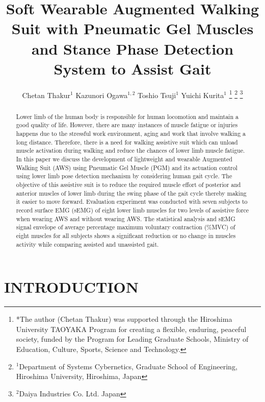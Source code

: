 \documentclass[letterpaper, 10 pt, conference]{ieeeconf}  %
\title{\LARGE \bf
Soft Wearable Augmented Walking Suit with Pneumatic Gel Muscles and Stance Phase Detection System to Assist Gait
}
\author{Chetan Thakur$^{1}$ Kazunori Ogawa$^{1,2}$ Toshio Tsuji$^{1}$ Yuichi Kurita$^{1}$%
\thanks{*The author (Chetan Thakur) was supported through the Hiroshima University
TAOYAKA Program for creating a flexible, enduring, peaceful society, funded by the Program for Leading
Graduate Schools, Ministry of Education, Culture, Sports, Science and Technology.}%
\thanks{$^{1}$Department of Systems Cybernetics, Graduate School of Engineering,
	Hiroshima University, Hiroshima, Japan
        {\tt\small }}%
\thanks{$^{2}$Daiya Industries Co. Ltd. Japan
        {\tt\small }}%
}
\begin{document}
\setlength{\pdfpageheight}{11in}
\setlength{\pdfpagewidth}{8.5in}

\maketitle
\thispagestyle{empty}
\pagestyle{empty}

\maketitle
\thispagestyle{empty}
\pagestyle{empty}


\begin{abstract}

Lower limb of the human body is responsible for human locomotion and maintain a good quality of life. However, there are many instances of muscle fatigue or injuries happens due to the stressful work environment, aging and work that involve walking a long distance. Therefore, there is a need for walking assistive suit which can unload muscle activation during walking and reduce the chances of lower limb muscle fatigue. In this paper we discuss the development of lightweight and wearable Augmented Walking Suit (AWS) using Pneumatic Gel Muscle (PGM) and its actuation control using lower limb pose detection mechanism by considering human gait cycle. The objective of this assistive suit is to reduce the required muscle effort of posterior and anterior muscles of lower limb during the swing phase of the gait cycle thereby making it easier to move forward. Evaluation experiment was conducted with seven subjects to record surface EMG (sEMG) of eight lower limb muscles for two levels of assistive force when wearing AWS and without wearing AWS. The statistical analysis and sEMG signal envelope of average percentage maximum voluntary contraction (\%MVC) of eight muscles for all subjects shows a significant reduction or no change in muscles activity while comparing assisted and unassisted gait.
\end{abstract}


\section{INTRODUCTION}\label{intro}
\end{document}
